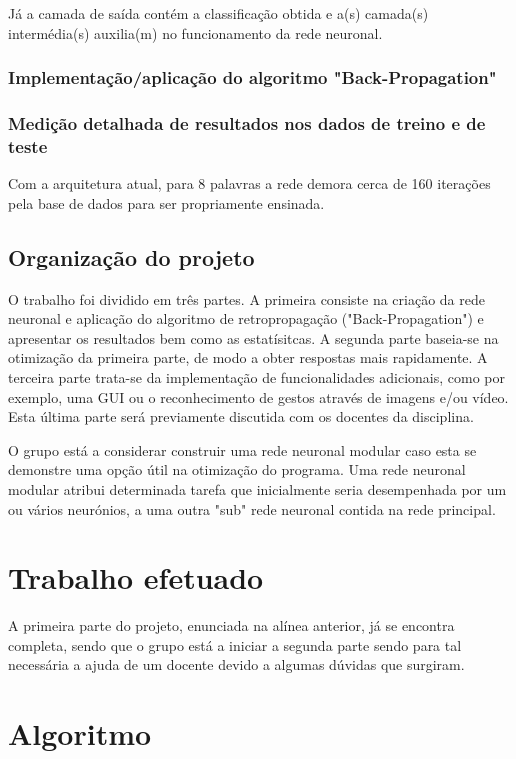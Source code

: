 \documentclass[10pt,a4paper]{article}
\begin{document}
Já a camada de saída contém a classificação obtida e a(s) camada(s) intermédia(s) auxilia(m) no funcionamento da rede neuronal.

\subsubsection{Implementação/aplicação do algoritmo "Back-Propagation"}

\subsubsection{Medição detalhada de resultados nos dados de treino e de teste}
Com a arquitetura atual, para 8 palavras a rede demora cerca de 160 iterações pela base de dados para ser propriamente ensinada.
\subsection{Organização do projeto}

O trabalho foi dividido em três partes. 
A primeira consiste na criação da rede neuronal e aplicação do algoritmo de retropropagação ("Back-Propagation") e apresentar os resultados bem como as estatísitcas.
A segunda parte baseia-se na otimização da primeira parte, de modo a obter respostas mais rapidamente.
A terceira parte trata-se da implementação de funcionalidades adicionais, como por exemplo, uma GUI ou o reconhecimento de gestos através de imagens e/ou vídeo. Esta última parte será previamente discutida com os docentes da disciplina.

O grupo está a considerar construir uma rede neuronal modular caso esta se demonstre uma opção útil na otimização do programa. Uma rede neuronal modular atribui determinada tarefa que inicialmente seria desempenhada por um ou vários neurónios, a uma outra "sub" rede neuronal contida na rede principal.


\section{Trabalho efetuado}

A primeira parte do projeto, enunciada na alínea anterior, já se encontra completa, sendo que o grupo está a iniciar a segunda parte sendo para tal necessária a ajuda de um docente devido a algumas dúvidas que surgiram.

\section{Algoritmo}
\end{document}
